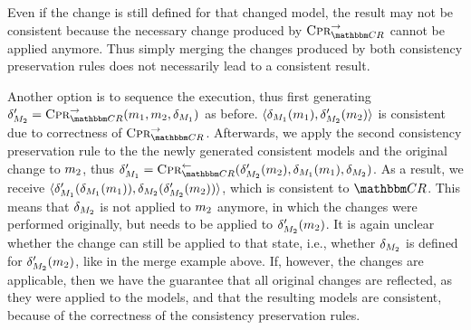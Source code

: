 Even if the change is still defined for that changed model, the result may not be consistent because the necessary change produced by $\consistencypreservationrule{\consistencyrelationset{CR}}^{\rightarrow}$ cannot be applied anymore.
Thus simply merging the changes produced by both consistency preservation rules does not necessarily lead to a consistent result.

Another option is to sequence the execution, thus first generating $\change{\metamodel{M}{2}}' = \consistencypreservationrule{\consistencyrelationset{CR}}^{\rightarrow}(\model{m}{1},\model{m}{2}, \change{\metamodel{M}{1}})$ as before.
$\tupled{\change{\metamodel{M}{1}}(\model{m}{1}), \change{\metamodel{M}{2}}'(\model{m}{2})}$ is consistent due to correctness of $\consistencypreservationrule{\consistencyrelationset{CR}}^{\rightarrow}$.
Afterwards, we apply the second consistency preservation rule to the the newly generated consistent models and the original change to $\model{m}{2}$, thus $\change{\metamodel{M}{1}}' = \consistencypreservationrule{\consistencyrelationset{CR}}^{\leftarrow}(\change{\metamodel{M}{2}}'(\model{m}{2}), \change{\metamodel{M}{1}}(\model{m}{1}), \change{\metamodel{M}{2}})$.
As a result, we receive $\tupled{\change{\metamodel{M}{1}}'(\change{\metamodel{M}{1}}(\model{m}{1})), \change{\metamodel{M}{2}}(\change{\metamodel{M}{2}}'(\model{m}{2}))}$, which is consistent to $\consistencyrelationset{CR}$.
This means that $\change{\metamodel{M}{2}}$ is not applied to $\model{m}{2}$ anymore, in which the changes were performed originally, but needs to be applied to $\change{\metamodel{M}{2}}'(\model{m}{2})$.
It is again unclear whether the change can still be applied to that state, i.e., whether $\change{\metamodel{M}{2}}$ is defined for $\change{\metamodel{M}{2}}'(\model{m}{2})$, like in the merge example above.
If, however, the changes are applicable, then we have the guarantee that all original changes are reflected, as they were applied to the models, and that the resulting models are consistent, because of the correctness of the consistency preservation rules.


